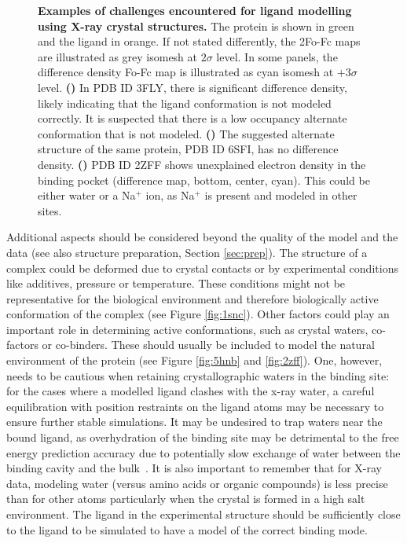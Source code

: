 \documentclass[9pt,bestpractices]{livecoms}
\begin{document}
\begin{figure}
    \caption{
    \textbf{Examples of challenges encountered for ligand modelling using X-ray crystal structures.}
    The protein is shown in green and the ligand in orange. If not stated differently, the 2Fo-Fc maps are illustrated as grey isomesh at $2\sigma$ level. In some panels, the difference density Fo-Fc map is illustrated as cyan isomesh at $+3\sigma$ level.
    \textbf{()} In PDB ID 3FLY, there is significant difference density, likely indicating that the ligand conformation is not modeled correctly.  It is suspected that there is a low occupancy alternate conformation that is not modeled.
    \textbf{()} The suggested alternate structure of the same protein, PDB ID 6SFI, has no difference density.
    \textbf{()} PDB ID 2ZFF shows unexplained electron density in the binding pocket (difference map, bottom, center, cyan). This could
    be either water or a Na$^+$ ion, as Na$^+$ is present and modeled in other sites. 
    }
    \label{fig:crystal2}
\end{figure}

Additional aspects should be considered beyond the quality of the model and the data (see also structure preparation, Section \ref{sec:prep}).
%
The structure of a complex could be deformed due to crystal contacts
or by experimental conditions like additives, pressure or temperature. These conditions might not be representative for the biological environment and therefore biologically active conformation of the complex (see Figure \ref{fig:1snc}). 
%
Other factors could play an important role in determining  active conformations, such as crystal waters, co-factors or co-binders. These should usually be included to model the natural environment of the protein (see Figure \ref{fig:5hnb} and \ref{fig:2zff}). One, however, needs to be cautious when retaining crystallographic waters in the binding site: for the cases where a modelled ligand clashes with the x-ray water, a careful equilibration with position restraints on the ligand atoms may be necessary to ensure further stable simulations. It may be undesired to trap waters near the bound ligand, as overhydration of the binding site may be detrimental to the free energy prediction accuracy due to potentially slow exchange of water between the binding cavity and the bulk~\cite{khalak2021absolutedg}. It is also important to remember that for X-ray data, modeling water (versus amino acids or organic compounds) is less precise than for other atoms particularly when the crystal is formed in a high salt environment.
%
The ligand in the experimental structure should be sufficiently close to the ligand to be simulated to have a model of the correct binding mode.
\end{document}
